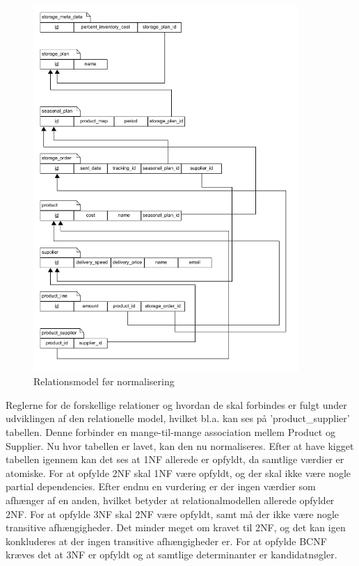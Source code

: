 \begin{figure}[H]
    \centering
    \includegraphics[width=0.9\textwidth]{figures/krav/relation_model_0th_normalization.png}
    \caption{Relationsmodel før normalisering}
    \label{fig:relational_model_0}
\end{figure}

Reglerne for de forskellige relationer og hvordan de skal forbindes er fulgt under udviklingen af den relationelle model, hvilket bl.a. kan ses på 'product\_supplier' tabellen. Denne forbinder en mange-til-mange association mellem Product og Supplier. 
Nu hvor tabellen er lavet, kan den nu normaliseres.
Efter at have kigget tabellen igennem kan det ses at 1NF allerede er opfyldt, da samtlige værdier er atomiske.
For at opfylde 2NF skal 1NF være opfyldt, og der skal ikke være nogle partial dependencies. Efter endnu en vurdering er der ingen værdier som afhænger af en anden, hvilket betyder at relationalmodellen allerede opfylder 2NF.
For at opfylde 3NF skal 2NF være opfyldt, samt må der ikke være nogle transitive afhængigheder. Det minder meget om kravet til 2NF, og det kan igen konkluderes at der ingen transitive afhængigheder er.
For at opfylde BCNF kræves det at 3NF er opfyldt og at samtlige determinanter er kandidatnøgler.


